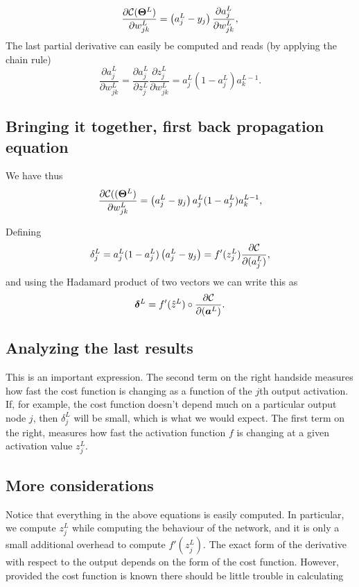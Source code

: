 \documentclass[%
oneside,                 %
final,                   %
10pt]{article}
\begin{document}
\[
\frac{\partial{\cal C}(\bm{\Theta}^L)}{\partial w_{jk}^L}  =  \left(a_j^L - y_j\right)\frac{\partial a_j^L}{\partial w_{jk}^{L}}, 
\]
The last partial derivative can easily be computed and reads (by applying the chain rule)
\[
\frac{\partial a_j^L}{\partial w_{jk}^{L}} = \frac{\partial a_j^L}{\partial z_{j}^{L}}\frac{\partial z_j^L}{\partial w_{jk}^{L}}=a_j^L(1-a_j^L)a_k^{L-1}.  
\]

\subsection{Bringing it together, first back propagation equation}

We have thus
\[
\frac{\partial{\cal C}((\bm{\Theta}^L)}{\partial w_{jk}^L}  =  \left(a_j^L - y_j\right)a_j^L(1-a_j^L)a_k^{L-1}, 
\]

Defining
\[
\delta_j^L = a_j^L(1-a_j^L)\left(a_j^L - y_j\right) = f'(z_j^L)\frac{\partial {\cal C}}{\partial (a_j^L)},
\]
and using the Hadamard product of two vectors we can write this as
\[
\bm{\delta}^L = f'(\hat{z}^L)\circ\frac{\partial {\cal C}}{\partial (\bm{a}^L)}.
\]

\subsection{Analyzing the last results}

This is an important expression. The second term on the right handside
measures how fast the cost function is changing as a function of the $j$th
output activation.  If, for example, the cost function doesn't depend
much on a particular output node $j$, then $\delta_j^L$ will be small,
which is what we would expect. The first term on the right, measures
how fast the activation function $f$ is changing at a given activation
value $z_j^L$.

\subsection{More considerations}

Notice that everything in the above equations is easily computed.  In
particular, we compute $z_j^L$ while computing the behaviour of the
network, and it is only a small additional overhead to compute
$f'(z^L_j)$.  The exact form of the derivative with respect to the
output depends on the form of the cost function.
However, provided the cost function is known there should be little
trouble in calculating
\end{document}
